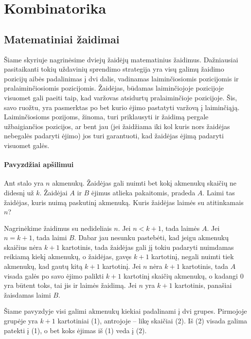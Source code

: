 \chapter{Kombinatorika}
\thispagestyle{empty}

\section{Matematiniai žaidimai}

Šiame skyriuje nagrinėsime dviejų žaidėjų matematinius žaidimus.
Dažniausiai pasitaikanti tokių uždavinių sprendimo strategija yra visų
galimų žaidimo pozicijų aibės padalinimas į dvi dalis, vadinamas laiminčiosiomis
pozicijomis ir pralaiminčiosiomis pozicijomis. Žaidėjas, būdamas
laiminčiojoje pozicijoje visuomet gali paeiti taip, kad varžovas atsidurtų
pralaiminčioje pozicijoje. Šis, savo ruožtu, yra pasmerktas po bet kurio
ėjimo pastatyti varžovą į laiminčiąją. Laiminčiosioms pozijoms, žinoma,
turi priklausyti ir žaidimą pergale užbaigiančios pozicijos, ar bent jau (jei
žaidžiama iki kol kuris nors žaidėjas nebegalės padaryti ėjimo) jos turi
garantuoti, kad žaidėjas ėjimą padaryti visuomet galės. 


\subsubsection{Pavyzdžiai apšilimui}

\begin{pavnr}
  Ant stalo yra $n$ akmenukų. Žaidėjas gali nuimti bet kokį akmenukų skaičių
  ne didesnį už $k$. Žaidėjai $A$ ir $B$ ėjimus atlieka pakaitomis, pradeda $A$.
  Laimi tas žaidėjas, kuris nuimą paskutinį akmenuką. Kuris žaidėjas laimės
  su atitinkamais $n$?
\end{pavnr}

Nagrinėkime žaidimus su nedideliais $n$. Jei  $n<k+1$, tada laimės $A$. Jei $n =
k+1$, tada laimi $B$. Dabar jau nesunku pastebėti, kad jeigu akmenukų skaičius
nėra $k+1$ kartotinis, tada žaidėjas gali jį tokiu padaryti nuimdamas
reikiamą kiekį akmenukų, o žaidėjas, gavęs  $k+1$ kartotinį, negali nuimti
tiek akmenukų, kad gautų kitą $k+1$ kartotinį. Jei $n$ nėra $k+1$
kartotinis, tada $A$ visada galės po savo ėjimo palikti $k+1$ kartotinį
skaičių akmenukų, o kadangi $0$ yra būtent toks, tai jis ir laimės žaidimą.
Jei $n$ yra $k+1$ kartotinis, panašiai žaisdamas laimi $B$. 

\begin{pastaba}Šiame pavyzdyje visi galimi akmenukų kiekiai padalinami į
  dvi grupes. Pirmojoje grupėje yra $k+1$ kartotiniai (1), antrojoje – likę
  skaičiai (2). Iš (2) visada galima patekti į (1), o bet koks ėjimas iš
  (1) veda į (2). 
\end{pastaba}

